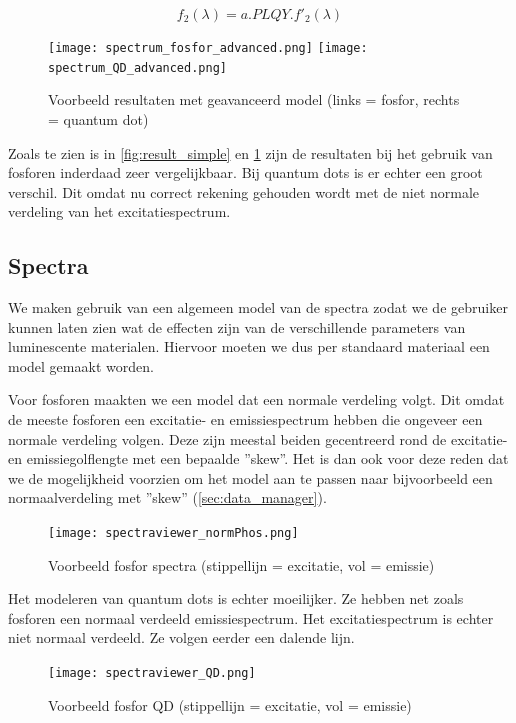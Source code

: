 \begin{equation}
    f_2(\lambda) = a.PLQY.f'_2(\lambda)
\end{equation}

\begin{figure}[H]
    \centering
    \texttt{[image: spectrum\_fosfor\_advanced.png]}
    \texttt{[image: spectrum\_QD\_advanced.png]}
    \caption{Voorbeeld resultaten met geavanceerd model (links = fosfor, rechts = quantum dot)}%
    \label{fig:result_advancded}
\end{figure}

Zoals te zien is in \ref{fig:result_simple} en \ref{fig:result_advancded} 
zijn de resultaten bij het gebruik van fosforen inderdaad zeer vergelijkbaar.
Bij quantum dots is er echter een groot verschil. 
Dit omdat nu correct rekening gehouden wordt met de niet normale verdeling van
het excitatiespectrum.

\subsection{Spectra}

We maken gebruik van een algemeen model van de spectra zodat we de gebruiker kunnen laten zien wat de effecten zijn van de verschillende
parameters van luminescente materialen. Hiervoor moeten we dus per standaard materiaal een model gemaakt worden.

Voor fosforen maakten we een model dat een normale verdeling volgt. Dit omdat de meeste
fosforen een excitatie- en emissiespectrum hebben die ongeveer een normale verdeling volgen. Deze
zijn meestal beiden gecentreerd rond de excitatie- en emissiegolflengte met een bepaalde
''skew''. Het is dan ook voor deze reden dat we de mogelijkheid voorzien om het model aan te passen naar bijvoorbeeld een normaalverdeling met ''skew'' (\cref{sec:data_manager}).

\begin{figure}[H]
    \centering
    \texttt{[image: spectraviewer\_normPhos.png]}
    \caption{Voorbeeld fosfor spectra (stippellijn = excitatie, vol = emissie) ~\cite{FluorescenceSpectraViewer}}%
    \label{fig:spectra_fosfor}
\end{figure}

Het modeleren van quantum dots is echter moeilijker. Ze hebben net zoals
fosforen een normaal verdeeld emissiespectrum. Het excitatiespectrum is echter
niet normaal verdeeld. Ze volgen eerder een dalende lijn.

\begin{figure}[H]
    \centering
    \texttt{[image: spectraviewer\_QD.png]}
    \caption{Voorbeeld fosfor QD (stippellijn = excitatie, vol = emissie) ~\cite{FluorescenceSpectraViewer}}%
    \label{fig:spectra_QD}
\end{figure}

